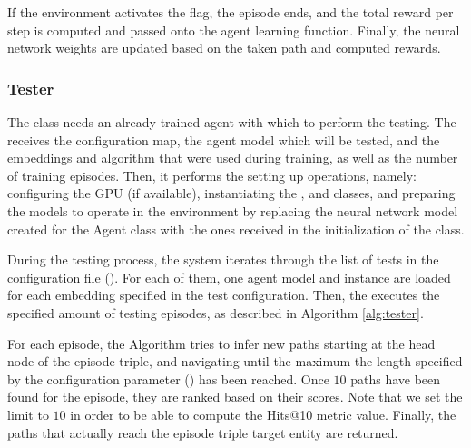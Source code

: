 If the environment activates the  flag, the episode ends, and the total reward per step is computed and passed onto the agent learning function. Finally, the neural network weights are updated based on the taken path and computed rewards.

\subsubsection{Tester}
The  class needs an already trained agent with which to perform the testing. The  receives the configuration map, the agent model which will be tested, and the embeddings and algorithm that were used during training, as well as the number of training episodes. Then, it performs the setting up operations, namely: configuring the GPU (if available), instantiating the ,  and  classes, and preparing the models to operate in the environment by replacing the neural network model created for the Agent class with the ones received in the initialization of the  class.

During the testing process, the system iterates through the list of tests in the configuration file (). For each of them, one agent model and  instance are loaded for each embedding specified in the test configuration. Then, the  executes the specified amount of testing episodes, as described in Algorithm \ref{alg:tester}. 

For each episode, the Algorithm tries to infer new paths starting at the head node of the episode triple, and navigating until the maximum the length specified by the configuration parameter () has been reached. Once $10$ paths have been found for the episode, they are ranked based on their scores. Note that we set the limit to $10$ in order to be able to compute the Hits@10 metric value. Finally, the paths that actually reach the episode triple target entity are returned. 

